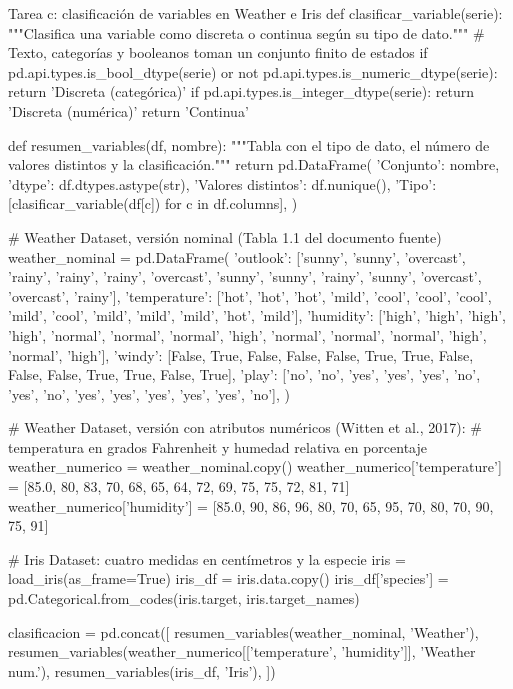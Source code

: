 \documentclass[11pt,letterpaper]{article}
\begin{document}
\begin{codigo}[label=cod:c]{Tarea c: clasificación de variables en Weather e Iris}
def clasificar_variable(serie):
    """Clasifica una variable como discreta o continua según su tipo de dato."""
    # Texto, categorías y booleanos toman un conjunto finito de estados
    if pd.api.types.is_bool_dtype(serie) or not pd.api.types.is_numeric_dtype(serie):
        return 'Discreta (categórica)'
    if pd.api.types.is_integer_dtype(serie):
        return 'Discreta (numérica)'
    return 'Continua'


def resumen_variables(df, nombre):
    """Tabla con el tipo de dato, el número de valores distintos y la clasificación."""
    return pd.DataFrame({
        'Conjunto': nombre,
        'dtype': df.dtypes.astype(str),
        'Valores distintos': df.nunique(),
        'Tipo': [clasificar_variable(df[c]) for c in df.columns],
    })


# Weather Dataset, versión nominal (Tabla 1.1 del documento fuente)
weather_nominal = pd.DataFrame({
    'outlook': ['sunny', 'sunny', 'overcast', 'rainy', 'rainy', 'rainy', 'overcast',
                'sunny', 'sunny', 'rainy', 'sunny', 'overcast', 'overcast', 'rainy'],
    'temperature': ['hot', 'hot', 'hot', 'mild', 'cool', 'cool', 'cool',
                    'mild', 'cool', 'mild', 'mild', 'mild', 'hot', 'mild'],
    'humidity': ['high', 'high', 'high', 'high', 'normal', 'normal', 'normal',
                 'high', 'normal', 'normal', 'normal', 'high', 'normal', 'high'],
    'windy': [False, True, False, False, False, True, True,
              False, False, False, True, True, False, True],
    'play': ['no', 'no', 'yes', 'yes', 'yes', 'no', 'yes',
             'no', 'yes', 'yes', 'yes', 'yes', 'yes', 'no'],
})

# Weather Dataset, versión con atributos numéricos (Witten et al., 2017):
# temperatura en grados Fahrenheit y humedad relativa en porcentaje
weather_numerico = weather_nominal.copy()
weather_numerico['temperature'] = [85.0, 80, 83, 70, 68, 65, 64, 72, 69, 75, 75, 72, 81, 71]
weather_numerico['humidity'] = [85.0, 90, 86, 96, 80, 70, 65, 95, 70, 80, 70, 90, 75, 91]

# Iris Dataset: cuatro medidas en centímetros y la especie
iris = load_iris(as_frame=True)
iris_df = iris.data.copy()
iris_df['species'] = pd.Categorical.from_codes(iris.target, iris.target_names)

clasificacion = pd.concat([
    resumen_variables(weather_nominal, 'Weather'),
    resumen_variables(weather_numerico[['temperature', 'humidity']], 'Weather num.'),
    resumen_variables(iris_df, 'Iris'),
])


\end{codigo}
\end{document}
